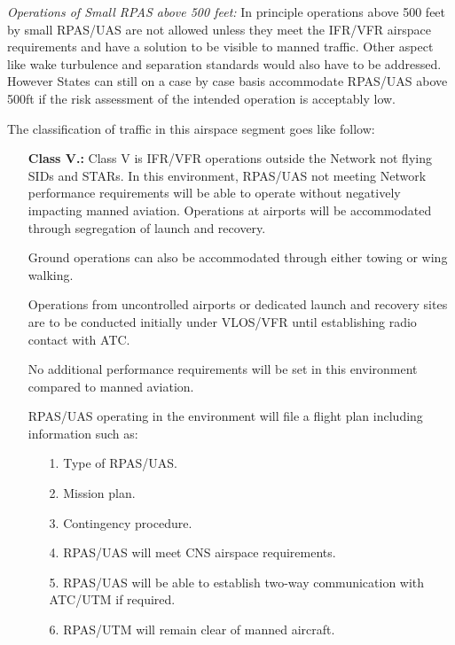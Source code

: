 \emph{Operations of Small RPAS above 500 feet:} In principle operations above 500 feet by small RPAS/UAS are not allowed unless they meet the IFR/VFR airspace requirements and have a solution to be visible to manned traffic. Other aspect like wake turbulence and separation standards would also have to be addressed. However States can still on a case by case basis accommodate RPAS/UAS above 500ft if the risk assessment of the intended operation is acceptably low.

\noindent The classification of traffic in this airspace segment goes like follow:

\begin{itemize}
    \item[\textbf{Class V.:}] Class V is IFR/VFR operations outside the Network not flying SIDs and STARs. In this environment, RPAS/UAS not meeting Network performance requirements will be able to operate without negatively impacting manned aviation. Operations at airports will be accommodated through segregation of launch and recovery.

    Ground operations can also be accommodated through either towing or wing walking.

    Operations from uncontrolled airports or dedicated launch and recovery sites are to be conducted initially under VLOS/VFR until establishing radio contact with ATC.

    No additional performance requirements will be set in this environment compared to manned aviation.
    
    RPAS/UAS operating in the environment will file a flight plan including information such as:
    \begin{itemize}
        \item[1.] Type of RPAS/UAS.
        
        \item[2.] Mission plan.
        
        \item[3.] Contingency procedure.
        
        \item[4.] RPAS/UAS will meet CNS airspace requirements.
        
        \item[5.] RPAS/UAS will be able to establish two-way communication with ATC/UTM if required.
        
        \item[6.]  RPAS/UTM will remain clear of manned aircraft.
        

\end{itemize}
\end{itemize}
